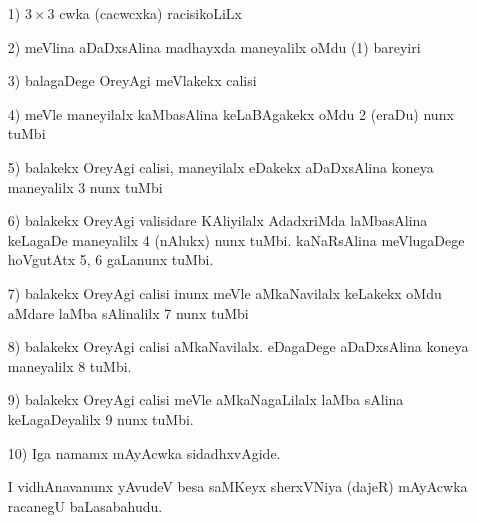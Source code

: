 \begin{enumerate}
\item[{\rm 1)}]  $3\times 3$ cwka (cacwcxka) racisikoLiLx

\item[{\rm 2)}] meVlina aDaDxsAlina madhayxda maneyalilx oMdu {\rm (1)} bareyiri

\item[{\rm 3)}] balagaDege OreyAgi meVlakekx calisi

\item[{\rm 4)}] meVle maneyilalx kaMbasAlina keLaBAgakekx oMdu {\rm 2} (eraDu) nunx tuMbi

\item[{\rm 5)}] balakekx OreyAgi calisi, maneyilalx eDakekx aDaDxsAlina koneya maneyalilx {\rm 3} nunx tuMbi

\item[{\rm 6)}] balakekx OreyAgi valisidare KAliyilalx AdadxriMda laMbasAlina keLagaDe maneyalilx {\rm 4} (nAlukx) nunx tuMbi. kaNaRsAlina meVlugaDege hoVgutAtx {\rm 5, 6} gaLanunx tuMbi.

\item[{\rm 7)}] balakekx OreyAgi calisi inunx meVle aMkaNavilalx keLakekx oMdu aMdare laMba sAlinalilx {\rm 7} nunx tuMbi

\item[{\rm 8)}] balakekx OreyAgi calisi aMkaNavilalx. eDagaDege aDaDxsAlina koneya maneyalilx {\rm 8} tuMbi.

\item[{\rm 9)}] balakekx OreyAgi calisi meVle aMkaNagaLilalx laMba sAlina keLagaDeyalilx {\rm 9} nunx tuMbi.

\item[{\rm 10)}] Iga namamx mAyAcwka sidadhxvAgide.

 I vidhAnavanunx yAvudeV besa saMKeyx sherxVNiya (dajeR) mAyAcwka racanegU baLasabahudu.
\end{enumerate}
